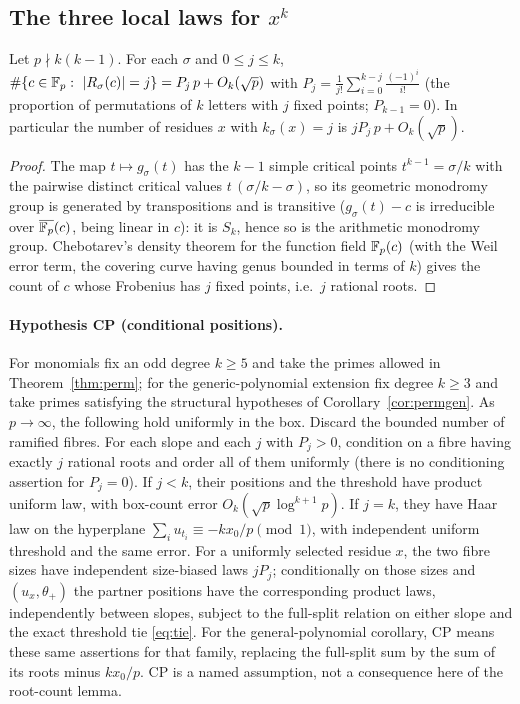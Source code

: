 \subsection*{The three local laws for $x^k$}

\begin{lemma}\label{lem:rootcounts}
Let $p\nmid k(k-1)$.  For each $\sigma$ and $0\le j\le k$,
$\#\{c\in\Fp:\ |R_\sigma(c)|=j\}=P_j\,p+O_k(\sqrt p)$ with $P_j=\frac1{j!}\sum_{i=0}^{k-j}\frac{(-1)^i}{i!}$ (the proportion of permutations of $k$ letters with
$j$ fixed points; $P_{k-1}=0$).  In particular the number of residues $x$ with $k_\sigma(x)=j$ is $jP_j\,p+O_k(\sqrt p)$.
\end{lemma}
\begin{proof}
The map $t\mapsto g_\sigma(t)$ has the $k-1$ simple critical points $t^{k-1}=\sigma/k$ with the pairwise distinct critical values $t\,(\sigma/k-\sigma)$,
so its geometric monodromy group is generated by transpositions and is transitive ($g_\sigma(t)-c$ is irreducible over $\overline{\mathbb{F}_p}(c)$, being linear in
$c$): it is $S_k$, hence so is the arithmetic monodromy group.  Chebotarev's density theorem for the function field $\mathbb{F}_p(c)$ (with the Weil error term, the
covering curve having genus bounded in terms of $k$) gives the count of $c$ whose Frobenius has $j$ fixed points, i.e.\ $j$ rational roots.
\end{proof}

\paragraph{Hypothesis CP (conditional positions).}\label{hyp:positions}
For monomials fix an odd degree $k\ge5$ and take the primes allowed in Theorem~\ref{thm:perm}; for the generic-polynomial extension fix degree $k\ge3$ and take primes satisfying the structural hypotheses of Corollary~\ref{cor:permgen}.  As $p\to\infty$, the following hold uniformly in the box.
Discard the bounded number of ramified fibres.  For each slope and each $j$ with $P_j>0$, condition on a fibre having exactly $j$ rational roots and order all of them uniformly (there is no conditioning assertion for $P_j=0$).
If $j<k$, their positions and the threshold have product uniform law, with box-count error $O_k(\sqrt p\log^{k+1}p)$.
If $j=k$, they have Haar law on the hyperplane $\sum_i u_{t_i}\equiv-kx_0/p\pmod1$, with independent uniform threshold and the same error.
For a uniformly selected residue $x$, the two fibre sizes have independent size-biased laws $jP_j$;
conditionally on those sizes and $(u_x,\theta_+)$ the partner positions have the corresponding product laws, independently between slopes,
subject to the full-split relation on either slope and the exact threshold tie \eqref{eq:tie}.
For the general-polynomial corollary, CP means these same assertions for that family, replacing the full-split sum by the sum of its roots minus $kx_0/p$.
CP is a named assumption, not a consequence here of the root-count lemma.

